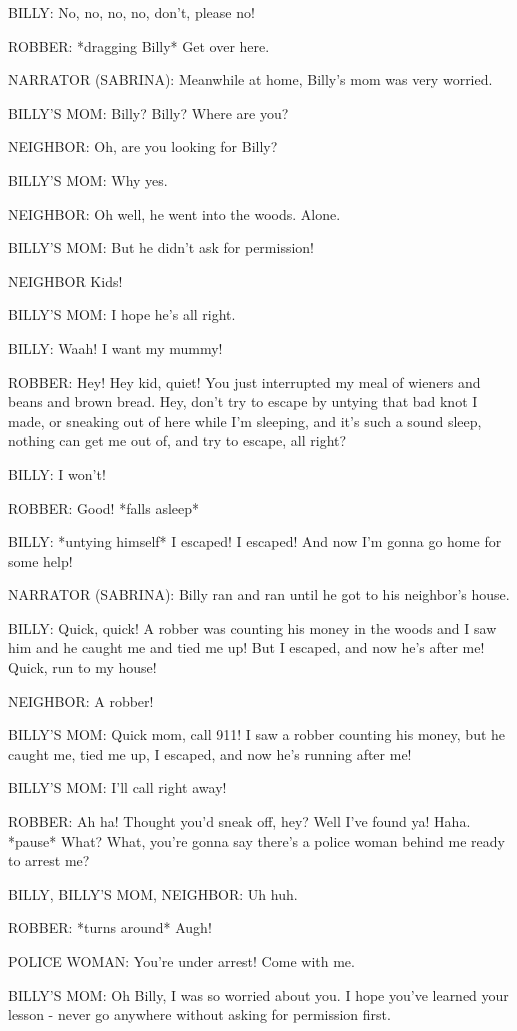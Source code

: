 BILLY:
No, no, no, no, don't, please no!

ROBBER:
*dragging Billy*
Get over here.

NARRATOR (SABRINA):
Meanwhile at home, Billy's mom was very worried.

BILLY'S MOM:
Billy?
Billy?
Where are you?

NEIGHBOR:
Oh, are you looking for Billy?

BILLY'S MOM:
Why yes.

NEIGHBOR:
Oh well, he went into the woods.
Alone.

BILLY'S MOM:
But he didn't ask for permission!

NEIGHBOR
Kids!

BILLY'S MOM:
I hope he's all right.

BILLY:
Waah!
I want my mummy!

ROBBER:
Hey!
Hey kid, quiet!
You just interrupted my meal of wieners and beans and brown bread.
Hey, don't try to escape by untying that bad knot I made, or sneaking out of here while I'm sleeping, and it's such a sound sleep, nothing can get me out of, and try to escape, all right?

BILLY:
I won't!

ROBBER:
Good!
*falls asleep*

BILLY:
*untying himself*
I escaped!
I escaped!
And now I'm gonna go home for some help!

NARRATOR (SABRINA):
Billy ran and ran until he got to his neighbor's house.

BILLY:
Quick, quick!
A robber was counting his money in the woods and I saw him and he caught me and tied me up!
But I escaped, and now he's after me!
Quick, run to my house!

NEIGHBOR:
A robber!

BILLY'S MOM:
Quick mom, call 911!
I saw a robber counting his money, but he caught me, tied me up, I escaped, and now he's running after me!

BILLY'S MOM:
I'll call right away!

ROBBER:
Ah ha!
Thought you'd sneak off, hey?
Well I've found ya!
Haha.
*pause*
What?
What, you're gonna say there's a police woman behind me ready to arrest me?

BILLY, BILLY'S MOM, NEIGHBOR:
Uh huh.

ROBBER:
*turns around*
Augh!

POLICE WOMAN:
You're under arrest!
Come with me.

BILLY'S MOM:
Oh Billy, I was so worried about you.
I hope you've learned your lesson - never go anywhere without asking for permission first.

